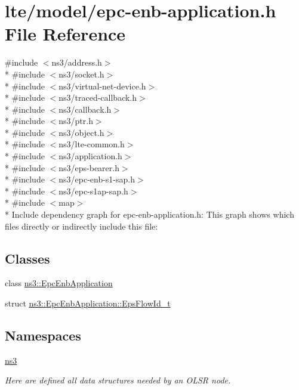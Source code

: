 \hypertarget{epc-enb-application_8h}{}\section{lte/model/epc-\/enb-\/application.h File Reference}
\label{epc-enb-application_8h}
{\ttfamily \#include $<$ns3/address.\+h$>$}\\*
{\ttfamily \#include $<$ns3/socket.\+h$>$}\\*
{\ttfamily \#include $<$ns3/virtual-\/net-\/device.\+h$>$}\\*
{\ttfamily \#include $<$ns3/traced-\/callback.\+h$>$}\\*
{\ttfamily \#include $<$ns3/callback.\+h$>$}\\*
{\ttfamily \#include $<$ns3/ptr.\+h$>$}\\*
{\ttfamily \#include $<$ns3/object.\+h$>$}\\*
{\ttfamily \#include $<$ns3/lte-\/common.\+h$>$}\\*
{\ttfamily \#include $<$ns3/application.\+h$>$}\\*
{\ttfamily \#include $<$ns3/eps-\/bearer.\+h$>$}\\*
{\ttfamily \#include $<$ns3/epc-\/enb-\/s1-\/sap.\+h$>$}\\*
{\ttfamily \#include $<$ns3/epc-\/s1ap-\/sap.\+h$>$}\\*
{\ttfamily \#include $<$map$>$}\\*
Include dependency graph for epc-\/enb-\/application.h\+:
This graph shows which files directly or indirectly include this file\+:
\subsection*{Classes}
\begin{DoxyCompactItemize}
\item 
class \hyperlink{classns3_1_1EpcEnbApplication}{ns3\+::\+Epc\+Enb\+Application}
\item 
struct \hyperlink{structns3_1_1EpcEnbApplication_1_1EpsFlowId__t}{ns3\+::\+Epc\+Enb\+Application\+::\+Eps\+Flow\+Id\+\_\+t}
\end{DoxyCompactItemize}
\subsection*{Namespaces}
\begin{DoxyCompactItemize}
\item 
 \hyperlink{namespacens3}{ns3}
\begin{DoxyCompactList}\small\item\em Here are defined all data structures needed by an O\+L\+SR node. \end{DoxyCompactList}\end{DoxyCompactItemize}
